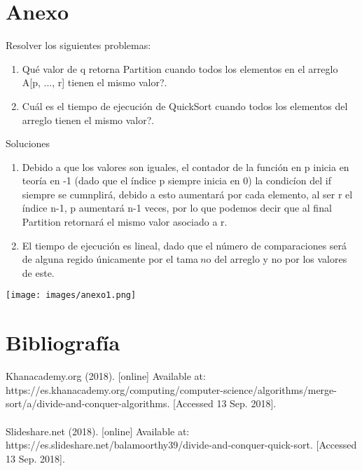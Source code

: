 \documentclass[12pt,twoside]{article}
\begin{document}
\section{Anexo}
Resolver los siguientes problemas:
\begin{enumerate}
  \item Qu\'e valor de q retorna Partition cuando todos los elementos en el arreglo A[p, ..., r] tienen el mismo valor?.
  \item Cu\'al es el tiempo de ejecuci\'on de QuickSort cuando todos los elementos del arreglo tienen el mismo valor?.
\end{enumerate}
Soluciones
\begin{enumerate}
  \item Debido a que los valores son iguales, el contador de la funci\'on en p inicia en teor\'ia en -1 (dado que el \'indice p siempre inicia en 0) la condic\'ion del if siempre se cumnplir\'a, debido a esto aumentar\'a por cada elemento, al ser r el \'indice n-1, p aumentar\'a n-1 veces, por lo que podemos decir que al final Partition retornar\'a el mismo valor asociado a r.
  \item El tiempo de ejecuci\'on es lineal, dado que el n\'umero de comparaciones ser\'a de alguna regido \'unicamente por el tama$~{n}$o del arreglo y no por los valores de este.
\end{enumerate}
\centerline{\texttt{[image: images/anexo1.png]}}
\section{Bibliograf\'ia}
Khanacademy.org (2018). [online] Available at: https://es.khanacademy.org/computing/computer-science/algorithms/merge-sort/a/divide-and-conquer-algorithms. [Accessed 13 Sep. 2018].\\\\
Slideshare.net (2018). [online] Available at: https://es.slideshare.net/balamoorthy39/divide-and-conquer-quick-sort. [Accessed 13 Sep. 2018].
\end{document}
